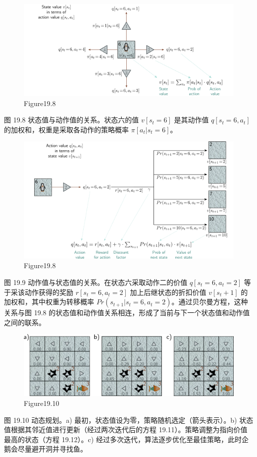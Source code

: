 \begin{figure}[h!]
\centering
\includegraphics[width=0.7\linewidth]{png/chapter19/ReinforceBellman3.png}
\caption{Figure19.8}
\end{figure}
图 19.8 状态值与动作值的关系。状态六的值 \(v[s_t =6]\) 是其动作值 \(q[s_t =6,a_t]\) 的加权和，权重是采取各动作的策略概率 \(π[a_t|s_t =6]\)。

\begin{figure}[h!]
\centering
\includegraphics[width=0.7\linewidth]{png/chapter19/ReinforceBellman2.png}
\caption{Figure19.8}
\end{figure}
图 19.9 动作值与状态值的关系。在状态六采取动作二的价值 \(q[s_t = 6, a_t = 2]\) 等于采该动作获得的奖励 \(r[s_t = 6, a_t = 2]\) 加上后继状态的折扣价值 \(v[s_t+1]\) 的加权和，其中权重为转移概率 \(Pr(s_{t+1}|s_t = 6, a_t = 2)\)。通过贝尔曼方程，这种关系与图 19.8 的状态值和动作值关系相连，形成了当前与下一个状态值和动作值之间的联系。

\begin{figure}[h!]
\centering
\includegraphics[width=0.7\linewidth]{png/chapter19/ReinforceDP.png}
\caption{Figure19.10}
\end{figure}
图 19.10 动态规划。a) 最初，状态值设为零，策略随机选定（箭头表示）。b) 状态值根据其邻近值进行更新（经过两次迭代后的方程 19.11）。策略调整为指向价值最高的状态（方程 19.12）。c) 经过多次迭代，算法逐步优化至最佳策略，此时企鹅会尽量避开洞并寻找鱼。


